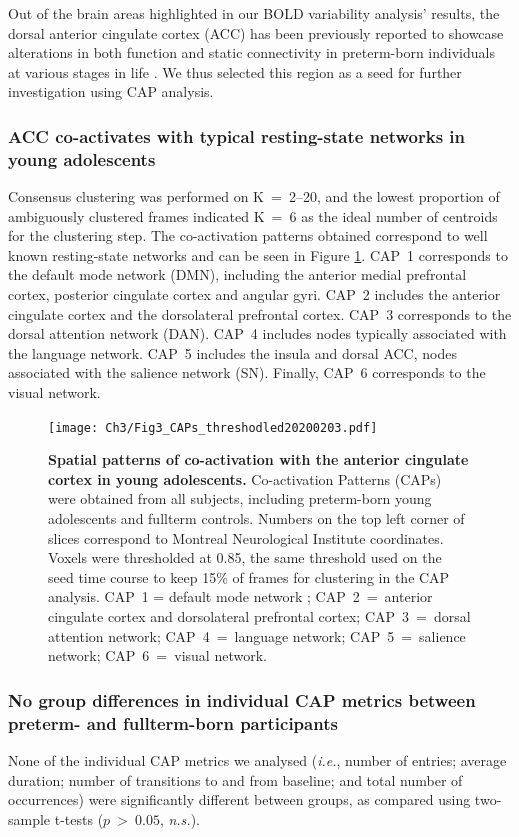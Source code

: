 Out of the brain areas highlighted in our BOLD variability analysis' results, the dorsal anterior cingulate cortex (ACC) has been previously reported to showcase alterations in both function and static connectivity in preterm-born individuals at various stages in life \citep{White2014,Daamen2015,Lordier2019}. We thus selected this region as a seed for further investigation using CAP analysis. 

\subsubsection*{ACC co-activates with typical resting-state networks in young adolescents} Consensus clustering was performed on K~=~2--20, and the lowest proportion of ambiguously clustered frames indicated K~=~6 as the ideal number of centroids for the clustering step. The co-activation patterns obtained correspond to well known resting-state networks and can be seen in Figure \ref{fig:CAPs}. CAP~1 corresponds to the default mode network (DMN), including the anterior medial prefrontal cortex, posterior cingulate cortex and angular gyri. CAP~2 includes the anterior cingulate cortex and the dorsolateral prefrontal cortex. CAP~3 corresponds to the dorsal attention network (DAN). CAP~4 includes nodes typically associated with the language network. CAP~5 includes the insula and dorsal ACC, nodes associated with the salience network (SN). Finally, CAP~6 corresponds to the visual network.


\begin{figure}[h]
\centering\texttt{[image: Ch3/Fig3\_CAPs\_threshodled20200203.pdf]}
\caption{\textbf{Spatial patterns of co-activation with the anterior cingulate cortex in young adolescents.} Co-activation Patterns (CAPs) were obtained from all subjects, including preterm-born young adolescents and fullterm controls. Numbers on the top left corner of slices correspond to Montreal Neurological Institute coordinates. Voxels were thresholded at 0.85, the same threshold used on the seed time course to keep 15\% of frames for clustering in the CAP analysis.  CAP~1 = default mode network ; CAP~2~=~anterior cingulate cortex and dorsolateral prefrontal cortex; CAP~3~=~dorsal attention network; CAP~4~=~language network; CAP~5~=~salience network; CAP~6~=~visual network.} \label{fig:CAPs}
\end{figure}




\subsubsection*{No group differences in individual CAP metrics between preterm- and fullterm-born participants} None of the individual CAP metrics we analysed (\textit{i.e.},  number of entries; average duration; number of transitions to and from baseline; and total number of occurrences) were significantly different between groups, as compared using two-sample t-tests ($p~>~0.05$, \textit{n.s.}). 

